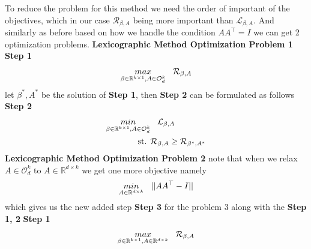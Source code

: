 To reduce the problem for this method we need the order of important of the objectives, which in our case $\mathcal{R}_{\beta, A}$ being more important than $\mathcal{L}_{\beta, A}$. And similarly as before based on how we handle the condition $AA^\top = I$ we can get 2 optimization problems.
\newline \textbf{Lexicographic Method Optimization Problem 1}
\newline \textbf{Step 1}
\begin{equation} \label{LMOP_1:step_1}
\begin{aligned}
    \underset{\beta\in \mathbb{R}^{k\times 1},A\in \mathcal{O}^{k}_{d}}{max}& \hspace{3mm} \mathcal{R}_{\beta, A}\\
\end{aligned}
\end{equation}
let $\beta^{*}, A^{*}$ be the solution of \textbf{Step 1}, then \textbf{Step 2} can be formulated as follows
\newline \textbf{Step 2}
\begin{equation}\label{LMOP_1:step_2}
\begin{aligned}
    \underset{\beta\in \mathbb{R}^{k\times 1},A\in \mathcal{O}^{k}_{d}}{min}& \hspace{3mm} \mathcal{L}_{\beta, A}\\
    \text{st.  }& \mathcal{R}_{\beta, A} \ge \mathcal{R}_{\beta^{*}, A^{*}}
\end{aligned}
\end{equation}
\newline \textbf{Lexicographic Method Optimization Problem 2}
\newline note that when we relax $A \in \mathcal{O}_d^k$ to $A \in \mathbb{R}^{d\times k}$ we get one more objective namely 
\begin{equation}
\begin{aligned}
\underset{A\in \mathbb{R}^{d\times k}}{min} \hspace{3mm} || AA^\top -I|| 
\end{aligned}
\end{equation}
which gives us the new added step \textbf{Step 3} for the problem 3 along with the \textbf{Step 1, 2} 
\newline \textbf{Step 1}
\begin{equation} \label{LMOP_2:step_1}
\begin{aligned}
    \underset{\beta\in \mathbb{R}^{k\times 1},A\in \mathbb{R}^{d\times k}}{max}& \hspace{3mm} \mathcal{R}_{\beta, A}\\
\end{aligned}
\end{equation}
